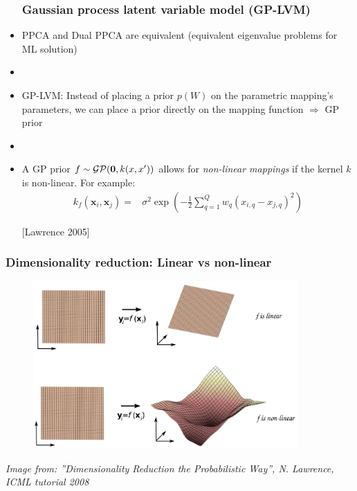 \documentclass{beamer}
\begin{document}
\begin{frame}
\begin{itemize}
\frametitle{Gaussian process latent variable model (GP-LVM)}
\item<1-> \alert{PPCA} and \alert{Dual PPCA} are equivalent (equivalent eigenvalue problems for ML solution)
\item<1->[]
\item<2-> \alert{GP-LVM}: Instead of placing a prior $p(W)$ on the parametric mapping's parameters, we can place a prior directly
on the mapping function $\Rightarrow$ GP prior
\item<2->[]
\item<3-> A \alert{GP prior} $f \sim \mathcal{GP}(\mathbf{0}, k(x,x'))$  allows for \emph{non-linear mappings}
    if the kernel $k$ is non-linear. For example:
          \begin{align*}
      \mathit{k_f} \left( \mathbf{x}_i, \mathbf{x}_j \right) = {} &  
		\sigma^2 \exp \left(
			- \frac{1}{2} \sum_{q=1}^{Q}  w_q \left(
                          \mathit{x_{i,q} - x_{j,q}} \right) ^2  \right)
    \end{align*}
\begin{flushright}
\footnotesize{
[Lawrence 2005]
}
\end{flushright}
\end{itemize}
\end{frame}




\begin{frame}
  \frametitle{Dimensionality reduction: Linear vs non-linear}    	
      \begin{figure}[t!]
        \centering
        \includegraphics[width=0.9\textwidth]{linearVsNonlinear.png}
      \end{figure}
\begin{flushright}
\tiny{
\textit{Image from: ''Dimensionality Reduction the Probabilistic Way'', N. Lawrence, ICML tutorial 2008}
}
\end{flushright}
\end{frame}
\end{document}
